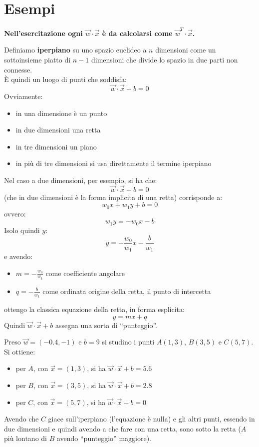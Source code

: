 \section{Esempi}
\textbf{Nell'esercitazione ogni $\vec{w}\cdot\vec{x}$ è da calcolarsi come
  $\vec{w}^T\cdot\vec{x}$.} 
\begin{definizione}
  Definiamo \textbf{iperpiano} su uno spazio euclideo a $n$ dimensioni come un
  sottoinsieme piatto di $n-1$ dimensioni che divide lo spazio in due parti non
  connesse. \\
  È quindi un luogo di punti che soddisfa:
  \[\vec{w}\cdot\vec{x}+b=0\]
  Ovviamente:
  \begin{itemize}
    \item in una dimensione è un punto
    \item in due dimensioni una retta
    \item in tre dimensioni un piano
    \item in più di tre dimensioni si usa direttamente il termine iperpiano
  \end{itemize}
  Nel caso a due dimensioni, per esempio, si ha che:
  \[\vec{w}\cdot\vec{x}+b=0\]
  (che in due dimensioni è la forma implicita di una retta) corrisponde a:
  \[w_0x+w_1y+b=0\]
  ovvero:
  \[w_1y=-w_0x-b\]
  Isolo quindi $y$:
  \[y=-\frac{w_0}{w_1}x-\frac{b}{w_1}\]
  e avendo:
  \begin{itemize}
    \item $m=-\frac{w_0}{w_1}$ come coefficiente angolare
    \item $q=-\frac{b}{w_1}$ come ordinata origine della retta, il punto di
    intercetta 
  \end{itemize}
  ottengo la classica equazione della retta, in forma esplicita:
  \[y=mx+q\]
  Quindi $\vec{w}\cdot\vec{x}+b$ assegna una sorta di ``punteggio''.

\end{definizione}
\begin{esempio}
  Preso $\vec{w}=(-0.4,-1)$ e $b=9$ si studino i punti $A(1, 3)$, $B(3, 5)$ e
  $C(5, 7)$.\\
  Si ottiene:
  \begin{itemize}
    \item per $A$, con $\vec{x}=(1, 3)$, si ha $\vec{w}\cdot\vec{x}+b=5.6$
    \item per $B$, con $\vec{x}=(3, 5)$, si ha $\vec{w}\cdot\vec{x}+b=2.8$
    \item per $C$, con $\vec{x}=(5, 7)$, si ha $\vec{w}\cdot\vec{x}+b=0$
  \end{itemize}
  Avendo che $C$ giace sull'iperpiano (l'equazione è nulla) e gli altri punti,
  essendo in due dimensioni e quindi avendo a che fare con una retta, sono sotto
  la retta ($A$ più lontano di $B$ avendo ``punteggio'' maggiore).
\end{esempio}

